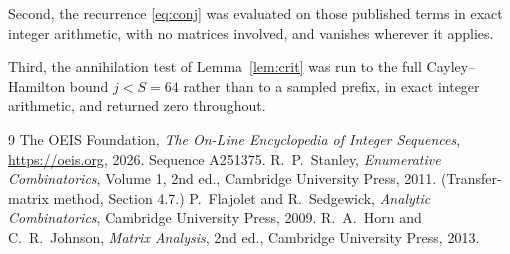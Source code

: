 \documentclass[11pt,a4paper]{article}
\theoremstyle{plain}
\theoremstyle{definition}
\begin{document}
Second, the recurrence \eqref{eq:conj} was evaluated on those published terms in exact
integer arithmetic, with no matrices involved, and vanishes wherever it applies.

Third, the annihilation test of Lemma~\ref{lem:crit} was run to the full Cayley--Hamilton
bound $j<S=64$ rather than to a sampled prefix, in exact integer arithmetic, and returned
zero throughout.

\begin{thebibliography}{9}
 The OEIS Foundation, \emph{The On-Line Encyclopedia of Integer
Sequences}, \url{https://oeis.org}, 2026. Sequence A251375.
 R.~P.~Stanley, \emph{Enumerative Combinatorics}, Volume 1, 2nd ed.,
Cambridge University Press, 2011. (Transfer-matrix method, Section 4.7.)
 P.~Flajolet and R.~Sedgewick, \emph{Analytic Combinatorics}, Cambridge
University Press, 2009.
 R.~A.~Horn and C.~R.~Johnson, \emph{Matrix Analysis}, 2nd ed., Cambridge
University Press, 2013.
\end{thebibliography}
\end{document}
